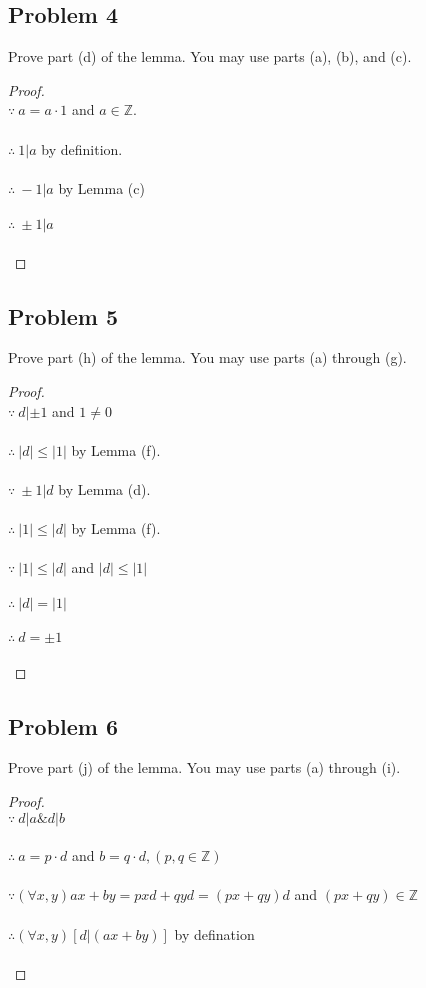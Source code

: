 \documentclass[paper=a4, fontsize=11pt]{scrartcl} %
\numberwithin{equation}{section} %
\numberwithin{figure}{section} %
\numberwithin{table}{section} %
\newcommand{\problem}[1]{\subsection *{Problem #1}}
\newcommand{\pnl}{$ $\newline\\}
\newcommand{\Z}{\mathbb{Z}}
\begin{document}
\problem 4
Prove part (d) of the lemma. You may use parts (a), (b), and (c).
\begin{proof}
\pnl
$\because \ a = a \cdot 1$ and $a \in \Z.$\\\\
$\therefore \ 1|a$  by definition.\\\\
$\therefore \ -1|a$  by Lemma (c)\\\\
$\therefore \ \pm 1|a$\\\\
\end{proof}

\problem 5
Prove part (h) of the lemma. You may use parts (a) through (g).
\begin{proof}
\pnl
$\because \ d|\pm 1$ and $1 \neq 0$\\\\
$\therefore \ |d| \leq |1|$ by Lemma (f).\\\\
$\because \ \pm 1 | d$ by Lemma (d).\\\\
$\therefore \ |1|\leq|d|$ by Lemma (f).\\\\
$\because \ |1|\leq|d|$ and $|d| \leq |1|$\\\\
$\therefore \ |d|=|1|$\\\\
$\therefore \ d=\pm 1$\\\\

\end{proof}

\problem 6
Prove part (j) of the lemma. You may use parts (a) through (i).
\begin{proof}
\pnl
$\because \ d|a \& d|b$\\\\
$\therefore \ a = p \cdot d$ and $b = q \cdot d, (p, q \in \Z)$\\\\
$\because  (\forall x, y) ax+by = pxd+qyd = (px+qy) d $ and $(px+qy) \in \Z$\\\\
$\therefore (\forall x, y) [d|(ax+by)]$ by defination\\\\
\end{proof}
\end{document}
